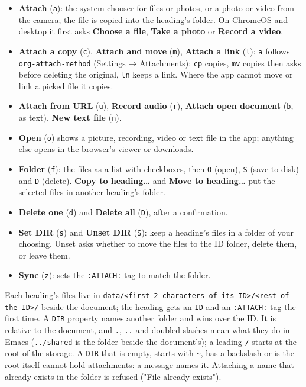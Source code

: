 \documentclass[11pt]{article}
\begin{document}
\begin{itemize}
\item \textbf{Attach} (\texttt{a}): the system chooser for files or photos, or a photo or video from the camera; the file is copied into the heading's folder. On ChromeOS and desktop it first asks \textbf{Choose a file}, \textbf{Take a photo} or \textbf{Record a video}.
\item \textbf{Attach a copy} (\texttt{c}), \textbf{Attach and move} (\texttt{m}), \textbf{Attach a link} (\texttt{l}): \texttt{a} follows \texttt{org-attach-method} (Settings → Attachments): \texttt{cp} copies, \texttt{mv} copies then asks before deleting the original, \texttt{ln} keeps a link. Where the app cannot move or link a picked file it copies.
\item \textbf{Attach from URL} (\texttt{u}), \textbf{Record audio} (\texttt{r}), \textbf{Attach open document} (\texttt{b}, as text), \textbf{New text file} (\texttt{n}).
\item \textbf{Open} (\texttt{o}) shows a picture, recording, video or text file in the app; anything else opens in the browser's viewer or downloads.
\item \textbf{Folder} (\texttt{f}): the files as a list with checkboxes, then \texttt{O} (open), \texttt{S} (save to disk) and \texttt{D} (delete). \textbf{Copy to heading…} and \textbf{Move to heading…} put the selected files in another heading's folder.
\item \textbf{Delete one} (\texttt{d}) and \textbf{Delete all} (\texttt{D}), after a confirmation.
\item \textbf{Set DIR} (\texttt{s}) and \textbf{Unset DIR} (\texttt{S}): keep a heading's files in a folder of your choosing. Unset asks whether to move the files to the ID folder, delete them, or leave them.
\item \textbf{Sync} (\texttt{z}): sets the \texttt{:ATTACH:} tag to match the folder.
\end{itemize}

Each heading's files live in \texttt{data/<first 2 characters of its ID>/<rest of the ID>/} beside the document; the heading gets an \texttt{ID} and an \texttt{:ATTACH:} tag the first time. A \texttt{DIR} property names another folder and wins over the ID. It is relative to the document, and \texttt{.}, \texttt{..} and doubled slashes mean what they do in Emacs (\texttt{../shared} is the folder beside the document's); a leading \texttt{/} starts at the root of the storage. A \texttt{DIR} that is empty, starts with \texttt{\textasciitilde{}}, has a backslash or is the root itself cannot hold attachments: a message names it. Attaching a name that already exists in the folder is refused ("File already exists").
\end{document}
